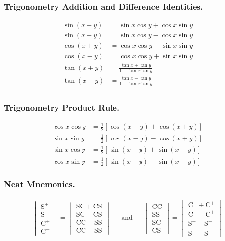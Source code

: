 \documentclass[../../../main.tex]{subfiles}
\begin{document}
\subsubsection{Trigonometry Addition and Difference Identities.}
\begin{align*}
    \sin(x+y)&=\sin x \cos y+ \cos x \sin y\\
    \sin(x-y)&=\sin x \cos y- \cos x \sin y\\
    \cos(x+y)&=\cos x \cos y- \sin x \sin y\\
    \cos(x-y)&=\cos x \cos y+ \sin x \sin y\\
    \tan (x+y)&=\frac{\tan x+\tan y}{1-\tan x\tan y}\\
    \tan (x-y)&=\frac{\tan x-\tan y}{1+\tan x\tan y}\\
\end{align*}

\subsubsection{Trigonometry Product Rule.}
\begin{align*}
    \cos x \cos y&= \frac{1}{2}[\cos(x-y)+\cos(x+y)]\\
    \sin x \sin y&= \frac{1}{2}[\cos(x-y)-\cos(x+y)]\\
    \sin x \cos y&= \frac{1}{2}[\sin(x+y)+\sin(x-y)]\\
    \cos x \sin y&= \frac{1}{2}[\sin(x+y)-\sin(x-y)]
\end{align*}

\subsubsection{Neat Mnemonics.}
\begin{align*}
    \begin{vmatrix}
        \mathrm{S^+}\\
        \mathrm{S^-}\\
        \mathrm{C^+}\\
        \mathrm{C^-}
    \end{vmatrix}=
    \begin{vmatrix}
        \mathrm{SC+CS}\\
        \mathrm{SC-CS}\\
        \mathrm{CC-SS}\\
        \mathrm{CC+SS}
    \end{vmatrix}
    &&\mathrm{and}&&
    \begin{vmatrix}
        \mathrm{CC}\\
        \mathrm{SS}\\
        \mathrm{SC}\\
        \mathrm{CS}
    \end{vmatrix}=
    \begin{vmatrix}
        \mathrm{C^-+C^+}\\
        \mathrm{C^--C^+}\\
        \mathrm{S^++S^-}\\
        \mathrm{S^+-S^-}
    \end{vmatrix}
\end{align*}
\end{document}

